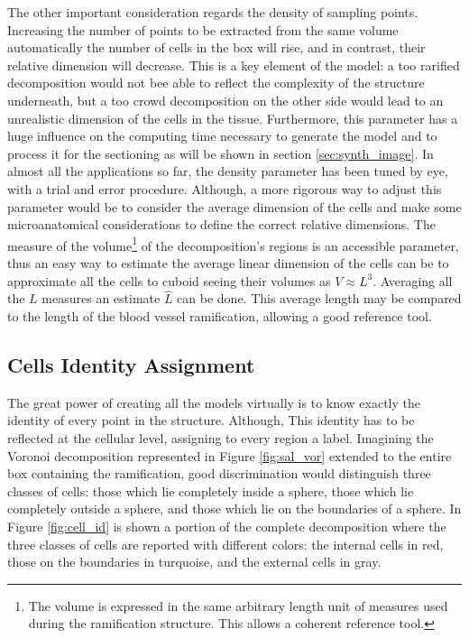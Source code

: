     The other important consideration regards the density of sampling points. Increasing the number of points to be extracted from the same volume automatically the number of cells in the box will rise, and in contrast, their relative dimension will decrease. This is a key element of the model: a too rarified decomposition would not bee able to reflect the complexity of the structure underneath, but a too crowd decomposition on the other side would lead to an unrealistic dimension of the cells in the tissue. Furthermore, this parameter has a huge influence on the computing time necessary to generate the model and to process it for the sectioning as will be shown in section \ref{sec:synth_image}. In almost all the applications so far, the density parameter has been tuned by eye, with a trial and error procedure. Although, a more rigorous way to adjust this parameter would be to consider the average dimension of the cells and make some microanatomical considerations to define the correct relative dimensions. The measure of the volume\footnote{The volume is expressed in the same arbitrary length unit of measures used during the ramification structure. This allows a coherent reference tool.} of the decomposition's regions is an accessible parameter, thus an easy way to estimate the average linear dimension of the cells can be to approximate all the cells to cuboid seeing their volumes as $V \approx L^3$. Averaging all the $L$ measures an estimate $\hat{L}$ can be done. This average length may be compared to the length of the blood vessel ramification, allowing a good reference tool.

\subsection{Cells Identity Assignment}
    The great power of creating all the models virtually is to know exactly the identity of every point in the structure. Although, This identity has to be reflected at the cellular level, assigning to every region a label. Imagining the Voronoi decomposition represented in Figure  \ref{fig:sal_vor} extended to the entire box containing the ramification, good discrimination would distinguish three classes of cells: those which lie completely inside a sphere, those which lie completely outside a sphere, and those which lie on the boundaries of a sphere. In Figure \ref{fig:cell_id} is shown a portion of the complete decomposition where the three classes of cells are reported with different colors: the internal cells in red, those on the boundaries in turquoise, and the external cells in gray.

